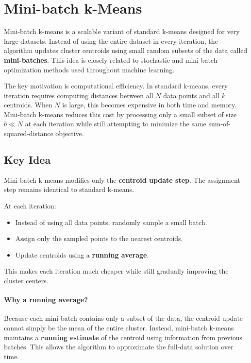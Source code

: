\documentclass{article}
\begin{document}
\section{Mini-batch k-Means}

Mini-batch k-means is a scalable variant of standard k-means designed for
very large datasets. Instead of using the entire dataset in every iteration,
the algorithm updates cluster centroids using small random subsets of the data
called \textbf{mini-batches}. This idea is closely related to stochastic and
mini-batch optimization methods used throughout machine learning.

The key motivation is computational efficiency. In standard k-means, every
iteration requires computing distances between all $N$ data points and all
$k$ centroids. When $N$ is large, this becomes expensive in both time and
memory. Mini-batch k-means reduces this cost by processing only a small subset
of size $b \ll N$ at each iteration while still attempting to minimize the same
sum-of-squared-distance objective.

\subsection{Key Idea}

Mini-batch k-means modifies only the \textbf{centroid update step}.
The assignment step remains identical to standard k-means.

At each iteration:
\begin{itemize}
\item Instead of using all data points, randomly sample a small batch.
\item Assign only the sampled points to the nearest centroids.
\item Update centroids using a \textbf{running average}.
\end{itemize}

This makes each iteration much cheaper while still gradually improving the
cluster centers.

\paragraph{Why a running average?}

Because each mini-batch contains only a subset of the data, the centroid update
cannot simply be the mean of the entire cluster. Instead, mini-batch k-means
maintains a \textbf{running estimate} of the centroid using information from
previous batches. This allows the algorithm to approximate the full-data
solution over time.
\end{document}
